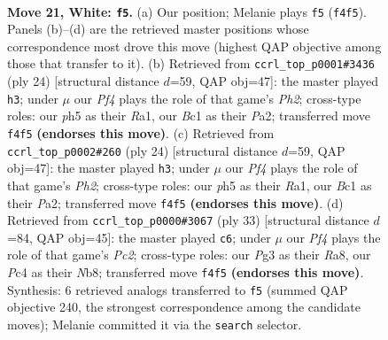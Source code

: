 \documentclass[11pt]{article}
\begin{document}
\begin{figure}[p]\centering
\begin{subfigure}{0.46\textwidth}\centering
\resizebox{\linewidth}{!}{%
\newchessgame
\chessboard[
  setfen={r1bq1r1k/2pn1pb1/1p1p1np1/3P3p/p1P2P2/P1N3PB/1PN1Q2P/1RB2RK1 w - - 1 21},
  showmover=false,
  pgfstyle=straightmove, color=movearrow, markmove={f4-f5}
]}
\caption{}
\end{subfigure}\hfill
\begin{subfigure}{0.46\textwidth}\centering
\resizebox{\linewidth}{!}{%
\newchessgame
\chessboard[
  setfen={r1b1r1k1/1p1nqpbp/2pp1np1/p7/2PNPB2/2N3P1/PPQ2PBP/R2R2K1 w - - 0 13},
  showmover=false,
  pgfstyle=straightmove, color=movearrow, markmove={h2-h3}
]}
\caption{}
\end{subfigure}
\\[4pt]
\begin{subfigure}{0.46\textwidth}\centering
\resizebox{\linewidth}{!}{%
\newchessgame
\chessboard[
  setfen={r1b1r1k1/1p1nqpbp/2pp1np1/p7/2PNPB2/2N3P1/PPQ2PBP/R2R2K1 w - - 0 13},
  showmover=false,
  pgfstyle=straightmove, color=movearrow, markmove={h2-h3}
]}
\caption{}
\end{subfigure}\hfill
\begin{subfigure}{0.46\textwidth}\centering
\resizebox{\linewidth}{!}{%
\newchessgame
\chessboard[
  setfen={rn1qr1k1/1bp2pbp/p2p1np1/1p1Pp3/1P2P3/P1P2N1P/2BN1PP1/R1BQR1K1 b - - 0 17},
  showmover=false,
  pgfstyle=straightmove, color=movearrow, markmove={c7-c6}
]}
\caption{}
\end{subfigure}
\caption{\textbf{Move 21, White: \texttt{f5}.} (a) Our position; Melanie plays \texttt{f5} (\texttt{f4f5}). Panels (b)--(d) are the retrieved master positions whose correspondence most drove this move (highest QAP objective among those that transfer to it). (b) Retrieved from \texttt{ccrl\_top\_p0001\#3436} (ply 24) [structural distance $d$=59, QAP obj=47]: the master played \texttt{h3}; under $\mu$ our \emph{Pf4} plays the role of that game's \emph{Ph2}; cross-type roles: our \emph{p}h5 as their \emph{R}a1, our \emph{B}c1 as their \emph{P}a2; transferred move \texttt{f4f5} \textbf{(endorses this move)}. (c) Retrieved from \texttt{ccrl\_top\_p0002\#260} (ply 24) [structural distance $d$=59, QAP obj=47]: the master played \texttt{h3}; under $\mu$ our \emph{Pf4} plays the role of that game's \emph{Ph2}; cross-type roles: our \emph{p}h5 as their \emph{R}a1, our \emph{B}c1 as their \emph{P}a2; transferred move \texttt{f4f5} \textbf{(endorses this move)}. (d) Retrieved from \texttt{ccrl\_top\_p0000\#3067} (ply 33) [structural distance $d$=84, QAP obj=45]: the master played \texttt{c6}; under $\mu$ our \emph{Pf4} plays the role of that game's \emph{Pc2}; cross-type roles: our \emph{P}g3 as their \emph{R}a8, our \emph{P}c4 as their \emph{N}b8; transferred move \texttt{f4f5} \textbf{(endorses this move)}. Synthesis: 6 retrieved analogs transferred to \texttt{f5} (summed QAP objective 240, the strongest correspondence among the candidate moves); Melanie committed it via the \texttt{search} selector.}
\label{fig:thought-m40}
\end{figure}
\end{document}

